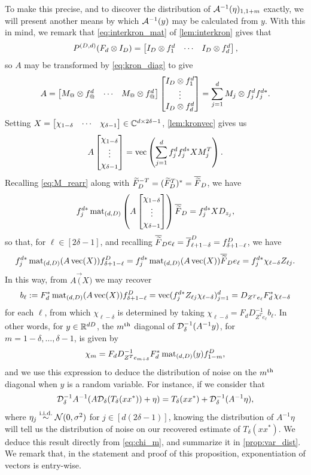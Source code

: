 To make this precise, and to discover the distribution of $\mathcal{A}^{-1}(\eta)_{1, 1 + m}$ exactly, we will present another means by which $\mathcal{A}^{-1}(y)$ may be calculated from $y$.  With this in mind, we remark that \eqref{eq:interkron_mat} of \cref{lem:interkron} gives that \[P^{(D, d)} (F_d \otimes I_D) = \begin{bmatrix} I_D \otimes f^d_{1} & \cdots & I_D \otimes f^d_{d} \end{bmatrix},\] so $A$ may be transformed by \eqref{eq:kron_diag} to give \[A = \rowmatfun{M_@ \kron f_@^d}{1}{d} \colmat{I_D \kron f^d}{1}{d} = \sum_{j = 1}^d M_j \kron f_j^d f_j^{d*}.\]  Setting $X = \begin{bmatrix} \chi_{1 - \delta} & \cdots & \chi_{\delta - 1} \end{bmatrix} \in \mathbb{C}^{d \times 2 \delta - 1}$, \cref{lem:kronvec} gives us \[A \begin{bmatrix} \chi_{1 - \delta} \\ \vdots \\ \chi_{\delta - 1} \end{bmatrix} = \operatorname{vec}\left(\sum_{j = 1}^d f_j^d f_j^{d*} X M_j^T\right).\]  Recalling \eqref{eq:M_rearr} along with $\widetilde{F}_D^{-T} = (\widetilde{F}_D^T)^* = \overline{\widetilde{F}}_D$, we have \[f_j^{d*} \operatorname{mat}_{(d, D)}\left(A \begin{bmatrix} \chi_{1 - \delta} \\ \vdots \\ \chi_{\delta - 1} \end{bmatrix}\right) \overline{\widetilde{F}}_D = f_j^{d*} X D_{z_j},\]
 so that, for $\ell \in [2 \delta - 1]$, and recalling $\overline{\widetilde{F}}_D e_\ell = \overline{f}^D_{\ell + 1 - \delta} = f_{\delta + 1 - \ell}^D$, we have \[f_j^{d *} \operatorname{mat}_{(d, D)}(A \operatorname{vec}(X)) f_{\delta + 1 - \ell}^D = f_j^{d*} \operatorname{mat}_{(d, D)}(A \operatorname{vec}(X)) \overline{\widetilde{F}}_D e_\ell = f_j^{d*} \chi_{\ell - \delta} Z_{\ell j}.\] In this way, from $A \vec(X)$ we may recover \[b_{\ell} := F_d^* \operatorname{mat}_{(d, D)}(A \operatorname{vec}(X)) f_{\delta + 1 - \ell}^D = \operatorname{vec}(f_j^{d*} Z_{\ell j} \chi_{\ell - \delta})_{j = 1}^d = D_{Z^T e_{\ell}} F_d^* \chi_{\ell - \delta}\] for each $\ell$, from which $\chi_{\ell - \delta}$ is determined by taking $\chi_{\ell - \delta} = F_d D_{Z^T e_{\ell}}^{-1} b_\ell$.
In other words, for $y \in \mathbb{R}^{d D}$, the $m^{\text{th}}$ diagonal of $\mathcal{D}_\delta^{-1}(A^{-1} y)$, for $m = 1 - \delta, \ldots, \delta - 1$, is given by \begin{equation} \chi_m = F_d D^{-1}_{Z^T e_{m + \delta}} F_d^* \operatorname{mat}_{(d, D)}(y) f_{1 - m}^D, \label{eq:chi_m} \end{equation} and we use this expression to deduce the distribution of noise on the $m^{\text{th}}$ diagonal when $y$ is a random variable.  For instance, if we consider that \[\mathcal{D}_\delta^{-1} A^{-1}(A \mathcal{D}_\delta(T_\delta(x x^*)) + \eta) = T_\delta(x x^*) + \mathcal{D}_\delta^{-1} (A^{-1} \eta),\] where $\eta_j \overset{\text{i.i.d.}}{\sim} \mathcal{N}(0, \sigma^2)$ for $j \in [d (2 \delta - 1)]$, knowing the distribution of $A^{-1} \eta$ will tell us the distribution of noise on our recovered estimate of $T_\delta(x x^*)$.  We deduce this result directly from \eqref{eq:chi_m}, and summarize it in \cref{prop:var_dist}.  We remark that, in the statement and proof of this proposition, exponentiation of vectors is entry-wise.
